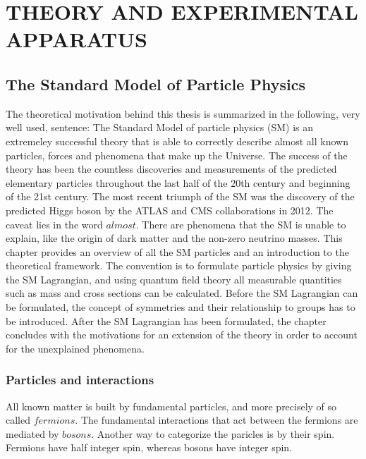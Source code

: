 \part{THEORY AND EXPERIMENTAL APPARATUS}
\noindent\justify
\chapter{The Standard Model of Particle Physics} \label{sec:theory}
\noindent\justify
The theoretical motivation behind this thesis is summarized in the following, very well used, sentence: 
The Standard Model of particle physics (SM) is an extremeley successful theory that is able to correctly describe almost all known particles, forces and phenomena that make up the Universe. 
The success of the theory has been the countless discoveries and measurements of the predicted elementary particles throughout the last half of the 20th century and beginning of the 21st century.  
The most recent triumph of the SM was the discovery of the predicted Higgs boson by the ATLAS \cite{Aad:2012tfa} and CMS \cite{Chatrchyan:2012xdj} collaborations in 2012.  
The caveat lies in the word $almost$. 
There are phenomena that the SM is unable to explain, like the origin of dark matter and the non-zero neutrino masses. 
This chapter provides an overview of all the SM particles and an introduction to the theoretical framework. 
The convention is to formulate particle physics by giving the SM Lagrangian, and using quantum field theory all measurable quantities such as mass and cross sections can be calculated. 
Before the SM Lagrangian can be formulated, the concept of symmetries and their relationship to groups has to be introduced.
After the SM Lagrangian has been formulated, the chapter concludes with the motivations for an extension of the theory in order to account for the unexplained phenomena.
\newpage
\section{Particles and interactions}  
\noindent\justify
All known matter is built by fundamental particles, and more precisely of so called $fermions$. 
The fundamental interactions that act between the fermions are mediated by $bosons$. 
Another way to categorize the paricles is by their spin. Fermions have half integer spin, whereas bosons have integer spin. 
